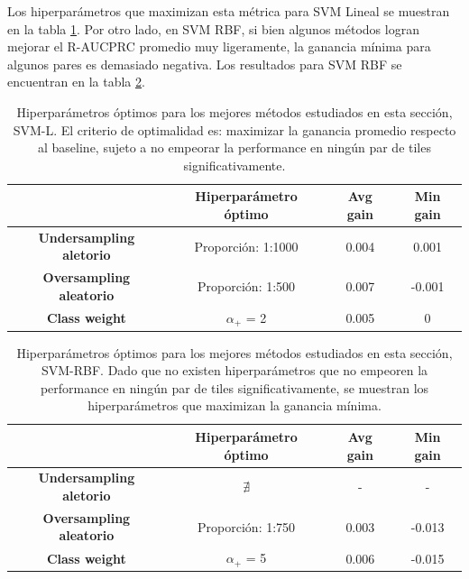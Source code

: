 Los hiperparámetros que maximizan esta métrica para SVM Lineal se muestran en la tabla \ref{tab:best_hyp_svml}. Por otro lado, en SVM RBF, si bien algunos métodos logran mejorar el R-AUCPRC promedio muy ligeramente, la ganancia mínima para algunos pares es demasiado negativa. Los resultados para SVM RBF se encuentran en la tabla \ref{tab:best_hyp_svmk}. 


\begin{table}[ht]
\centering
\begin{tabular}{c|c|c|c|}
\cline{2-4}
\textbf{}                                             & \textbf{Hiperparámetro óptimo} & \textbf{Avg gain} & \textbf{Min gain} \\ \hline
\multicolumn{1}{|c|}{\textbf{Undersampling aletorio}} & Proporción: 1:1000       & 0.004             & 0.001            \\ \hline
\multicolumn{1}{|c|}{\textbf{Oversampling aleatorio}} & Proporción: 1:500        & 0.007             & -0.001            \\ \hline
\multicolumn{1}{|c|}{\textbf{Class weight}}           & $\alpha_+$ = 2           & 0.005             & 0            \\ \hline
\end{tabular}
\caption{Hiperparámetros óptimos para los mejores métodos estudiados en esta sección, SVM-L. El criterio de optimalidad es: maximizar la ganancia promedio respecto al baseline, sujeto a no empeorar la performance en ningún par de tiles significativamente.}
\label{tab:best_hyp_svml}
\end{table}

 
\begin{table}[ht]
\centering
\begin{tabular}{c|c|c|c|}
\cline{2-4}
\textbf{}                                             & \textbf{Hiperparámetro óptimo} & \textbf{Avg gain} & \textbf{Min gain} \\ \hline
\multicolumn{1}{|c|}{\textbf{Undersampling aletorio}} &  $\nexists$       &  -       &  - \\ \hline
\multicolumn{1}{|c|}{\textbf{Oversampling aleatorio}} & Proporción: 1:750        &  0.003       & -0.013 \\ \hline
\multicolumn{1}{|c|}{\textbf{Class weight}}           & $\alpha_+$ = 5    & 0.006     & -0.015             \\ \hline
\end{tabular}
\caption{Hiperparámetros óptimos para los mejores métodos estudiados en esta sección, SVM-RBF. Dado que no existen hiperparámetros que no empeoren la performance en ningún par de tiles significativamente, se muestran los hiperparámetros que maximizan la ganancia mínima. }
\label{tab:best_hyp_svmk}
\end{table}

